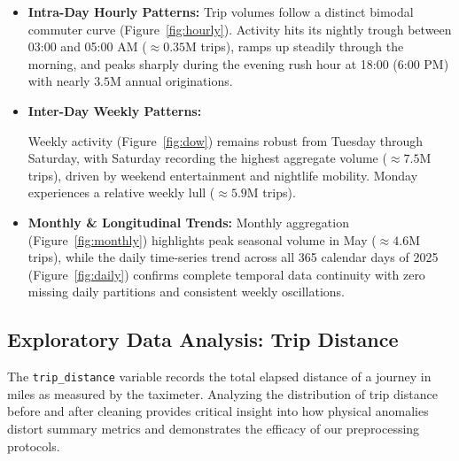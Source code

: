 \documentclass[11pt,a4paper]{article}
\begin{document}
\begin{itemize}
    \item \textbf{Intra-Day Hourly Patterns:}
     Trip volumes follow a distinct bimodal commuter curve (Figure~\ref{fig:hourly}). Activity hits its nightly trough between 03:00 and 05:00 AM ($\approx 0.35\text{M}$ trips), ramps up steadily through the morning, and peaks sharply during the evening rush hour at 18:00 (6:00 PM) with nearly $3.5\text{M}$ annual originations.
    \item 
    \textbf{Inter-Day Weekly Patterns:} 

    Weekly activity (Figure~\ref{fig:dow}) remains robust from Tuesday through Saturday, with Saturday recording the highest aggregate volume ($\approx 7.5\text{M}$ trips), driven by weekend entertainment and nightlife mobility. Monday experiences a relative weekly lull ($\approx 5.9\text{M}$ trips).
    
    \item \textbf{Monthly \& Longitudinal Trends:} 
    Monthly aggregation (Figure~\ref{fig:monthly}) highlights peak seasonal volume in May ($\approx 4.6\text{M}$ trips), while the daily time-series trend across all 365 calendar days of 2025 (Figure~\ref{fig:daily}) confirms complete temporal data continuity with zero missing daily partitions and consistent weekly oscillations.
\end{itemize}



\subsection{Exploratory Data Analysis: Trip Distance}
\label{sec:eda_trip_distance}

The \texttt{trip\_distance} variable records the total elapsed distance of a journey in miles as measured by the taximeter. Analyzing the distribution of trip distance before and after cleaning provides critical insight into how physical anomalies distort summary metrics and demonstrates the efficacy of our preprocessing protocols.
\end{document}
